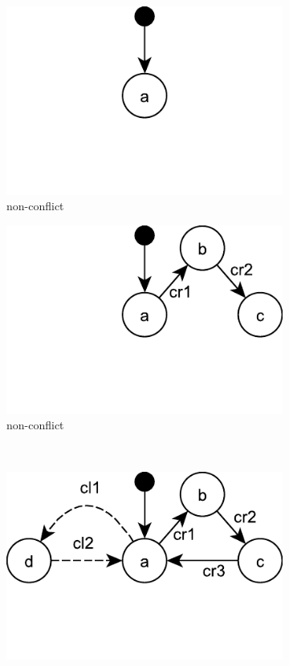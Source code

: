 \begin{figure}[ht]
  \begin{subfigure}[t]{0.48\linewidth}
    \includegraphics[width=\linewidth]{statechart_01}
    \caption{non-conflict}
    \label{fig:statechart_01}
  \end{subfigure}
  \hfill
  \begin{subfigure}[t]{0.48\linewidth}
    \includegraphics[width=\linewidth]{statechart_02}
    \caption{non-conflict}
    \label{fig:statechart_02}
  \end{subfigure}
  \\
  \begin{subfigure}[t]{0.48\linewidth}
    \includegraphics[width=\linewidth]{statechart_03}

\end{subfigure}
\end{figure}
